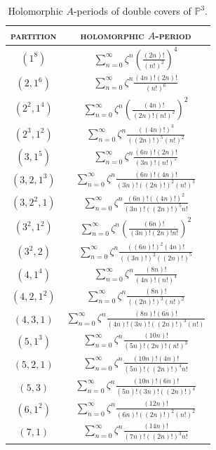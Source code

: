 \documentclass[12pt,a4paper,oneside]{amsart}
\numberwithin{equation}{section}
\theoremstyle{definition}
\theoremstyle{remark}
\newcommand{\cP}{\mathbb{P}}
\begin{document}
\begin{table}[th]
\centering
\begin{tabular}{|c |c |}
	\hline
	\textsc{partition} & \textsc{holomorphic $A$-period}  \\
	\hline
	$(1^8)$ &  $\sum_{n=0}^{\infty} \zeta^n \left( \frac{ (2n)!}{(n!)^2}\right)^4 $  \\
	$(2, 1^6)$ & $\sum_{n=0}^{\infty} \zeta^n  \frac{(4n)! (2n)!}{(n!)^6}$ \\
	$(2^2, 1^4)$ & $\sum_{n=0}^{\infty} \zeta^n \left(  \frac{(4n)!}{(2n)! (n!)^2} \right)^2 $  \\
	$(2^3,1^2)$ & $\sum_{n=0}^{\infty} \zeta^n  \frac{((4n)!)^3}{((2n)!)^5 (n!)^2} $ \\
	$(3,1^5)$ & $\sum_{n=0}^{\infty} \zeta^n  \frac{(6n)! (2n)!}{(3n)! (n!)^5}$ \\
	$(3,2,1^3)$ & $\sum_{n=0}^{\infty} \zeta^n  \frac{(6n)! (4n)!}{(3n)! ((2n)!)^2 (n!)^3}$ \\
	$(3,2^2,1)$ & $\sum_{n=0}^{\infty} \zeta^n  \frac{(6n)! ((4n)!)^2}{(3n)! ((2n)!)^5 n!}$ \\
	$(3^2,1^2)$ & $\sum_{n=0}^{\infty} \zeta^n \left(  \frac{(6n)!}{(3n)! (2n)! n!} \right)^2 $ \\
	$(3^2,2)$ & $\sum_{n=0}^{\infty} \zeta^n  \frac{((6n)!)^2 (4n)!}{((3n)!)^2 ((2n)!)^5 }$ \\
	$(4,1^4)$ & $\sum_{n=0}^{\infty} \zeta^n  \frac{(8n)!}{(4n)! (n!)^4}$ \\
	$(4,2,1^2)$ & $\sum_{n=0}^{\infty} \zeta^n  \frac{(8n)!}{((2n)!)^3 (n!)^2}$ \\
	$(4,3,1)$ & $\sum_{n=0}^{\infty} \zeta^n  \frac{(8n)! (6n)!}{(4n)! (3n)! ((2n)!)^3 (n!)}$ \\
	$(5, 1^3)$ & $\sum_{n=0}^{\infty} \zeta^n  \frac{(10n)!}{(5n)!(2n)! (n!)^3}$ \\
	$(5,2,1)$ & $\sum_{n=0}^{\infty} \zeta^n  \frac{(10n)! (4n)!}{(5n)! ((2n)!)^4 n!}$ \\
	$(5,3)$ & $\sum_{n=0}^{\infty} \zeta^n  \frac{(10n)! (6n)!}{(5n)! (3n)! ((2n)!)^4 }$ \\
	$(6,1^2)$ & $\sum_{n=0}^{\infty} \zeta^n  \frac{(12n)!}{(6n)! ((2n)!)^2 (n!)^2}$ \\	
	$(7,1)$ & $\sum_{n=0}^{\infty} \zeta^n  \frac{(14n)!}{(7n)! ((2n)!)^3 n!}$ \\
	\hline
\end{tabular}
\caption{Holomorphic $A$-periods of double covers of $\cP^3$.}
\label{tab:listPi0}
\end{table}\par
\end{document}
